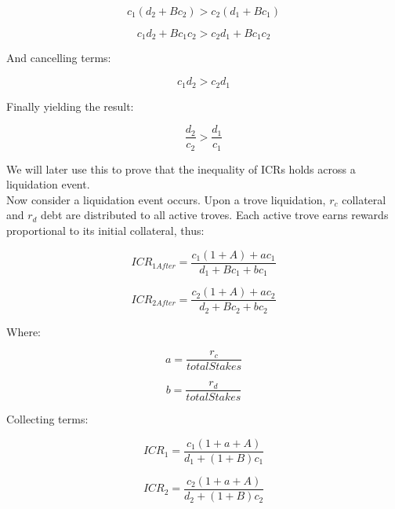\documentclass[reqno]{article}
\begin{document}
\begin{equation} 
    c_1\left(d_2+Bc_2\right)>c_2\left(d_1+Bc_1\right)
\end{equation}

\begin{equation} 
    c_1d_2+Bc_1c_2 > c_2d_1+Bc_1c_2
\end{equation}

\bigskip
And cancelling terms:

\begin{equation}
    c_1d_2 > c_2d_1
\end{equation}

\bigskip
Finally yielding the result:

\begin{equation} \label{eq:217}
    \frac{d_2}{c_2}>\frac{d_1}{c_1}
\end{equation}

\bigskip
We will later use this to prove that the inequality of ICRs holds across a liquidation event.\\

Now consider a liquidation event occurs. Upon a trove liquidation, $r_c$ collateral and $r_d$ debt are distributed to all active troves. Each active trove earns rewards proportional to its initial collateral, thus:

\begin{equation} 
    ICR_{1After}=\frac{c_1\left(1+A\right)+ac_1}{d_1+Bc_1+bc_1}
\end{equation}

\begin{equation} 
    ICR_{2After}=\frac{c_2\left(1+A\right)+ac_2}{d_2+Bc_2+bc_2}
\end{equation}

\bigskip
Where:

\begin{equation} 
    a=\frac{r_c}{totalStakes}
\end{equation}

\begin{equation} 
    b=\frac{r_d}{totalStakes}
\end{equation}

\bigskip
Collecting terms:

\begin{equation} 
    ICR_1=\frac{c_1\left(1+a+A\right)}{d_1+\left(1+B\right)c_1}
\end{equation}

\begin{equation} 
    ICR_2=\frac{c_2\left(1+a+A\right)}{d_2+\left(1+B\right)c_2}
\end{equation}
\end{document}

